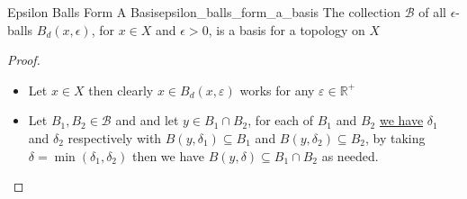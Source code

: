 \begin{proposition}{Epsilon Balls Form A Basis}{epsilon_balls_form_a_basis}
The collection $ \mathcal{ B }   $ of all $\epsilon$-balls $B_{d}(x, \epsilon)$, for $x \in X$ and $\epsilon>0$, is a basis for a topology on $X$
\end{proposition}
\begin{proof}
    \begin{itemize}
        \item Let $ x \in  X $ then clearly $ x \in  B _{ d }  \left( x, \varepsilon    \right)  $ works for any $ \varepsilon  \in  \mathbb{R} ^{ +  }   $ 
        \item Let $  B _{ 1 } , B _{ 2 } \in  \mathcal{ B }    $ and and let $ y \in  B _{ 1 } \cap B _{ 2 }  $, for each of $ B _{ 1 }  $ and $ B _{ 2 }  $ \hyperref[lemma:epsilon_ball_contains_another]{we have} $ \delta _{ 1 }  $ and $ \delta _{ 2 }  $ respectively with $ B\left( y, \delta _{ 1 }  \right) \subseteq B _{ 1 }  $ and $ B\left( y, \delta _{ 2 }  \right) \subseteq B _{ 2 }  $, by taking $ \delta =  \min\left( \delta _{ 1 }  , \delta _{ 2 }   \right)  $ then we have $ B\left( y, \delta  \right) \subseteq B _{ 1 } \cap  B _{ 2 }   $ as needed.
    \end{itemize}
\end{proof}
